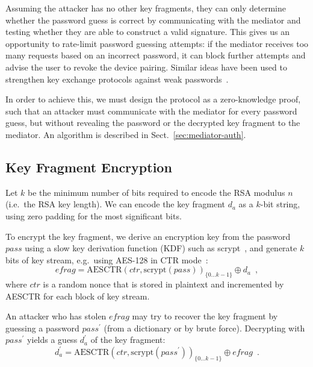 \documentclass{llncs}
\begin{document}
Assuming the attacker has no other key fragments, they can only determine whether the password guess
is correct by communicating with the mediator and testing whether they are able to construct a valid
signature. This gives us an opportunity to rate-limit password guessing attempts: if the mediator
receives too many requests based on an incorrect password, it can block further attempts and advise
the user to revoke the device pairing. Similar ideas have been used to strengthen key exchange
protocols against weak passwords~\cite{Bellovin92}.

In order to achieve this, we must design the protocol as a zero-knowledge proof, such that an
attacker must communicate with the mediator for every password guess, but without revealing the
password or the decrypted key fragment to the mediator. An algorithm is described in
Sect.~\ref{sec:mediator-auth}.

\subsection{Key Fragment Encryption}\label{sec:fragment-encryption}

Let $k$ be the minimum number of bits required to encode the RSA modulus $n$ (i.e.\ the RSA key
length). We can encode the key fragment $d_a$ as a $k$-bit string, using zero padding for the most
significant bits.

To encrypt the key fragment, we derive an encryption key from the password $\mathit{pass}$ using a
slow key derivation function (KDF) such as scrypt~\cite{Percival09}, and generate $k$ bits of key
stream, e.g.\ using AES-128 in CTR mode~\cite{Lipmaa00}:
\begin{equation}
\mathit{efrag} =
    \mathrm{AESCTR}(\mathit{ctr}, \mathrm{scrypt}(\mathit{pass}))_{\{0 \dots k-1\}} \oplus d_a
    \enspace,
\end{equation}
where $\mathit{ctr}$ is a random nonce that is stored in plaintext and incremented by AESCTR for
each block of key stream.

An attacker who has stolen $\mathit{efrag}$ may try to recover the key fragment by guessing a
password $\mathit{pass}^\prime$ (from a dictionary or by brute force). Decrypting with
$\mathit{pass}^\prime$ yields a guess $d_a^\prime$ of the key fragment:
\begin{equation}
d_a^\prime =
    \mathrm{AESCTR}(\mathit{ctr}, \mathrm{scrypt}(\mathit{pass}^\prime))_{\{0 \dots k-1\}} \oplus \mathit{efrag}
    \enspace.
\end{equation}
\end{document}
